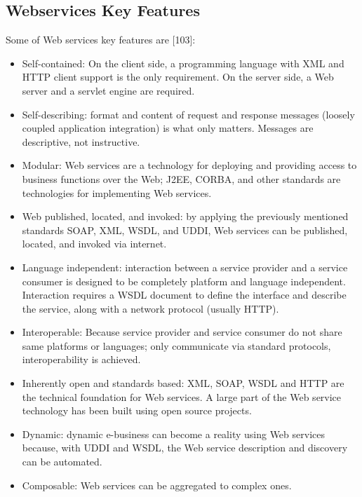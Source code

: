 \documentclass[12pt,a4paper,final,twoside,onecolumn,titlepage]{book}
\begin{document}
\subsection{Webservices Key Features}
Some of Web services key features are [103]:
\begin{itemize}
\item Self-contained: On the client side, a programming language with \gls{XML} and \gls{HTTP} client support is the only requirement. On the server side, a Web server and a servlet engine are required.
\item Self-describing: format and content of request and response messages (loosely coupled application integration) is what only matters. Messages are descriptive, not instructive.
\item Modular: Web services are a technology for deploying and providing access to business functions over the Web; J2EE, \gls{CORBA}, and other standards are technologies for implementing Web services.
\item Web published, located, and invoked: by applying the previously mentioned standards \gls{SOAP}, \gls{XML}, \gls{WSDL}, and \gls{UDDI}, Web services can be published, located, and invoked via internet.
\item Language independent: interaction between a service provider and a service consumer is designed to be completely platform and language independent. Interaction requires a \gls{WSDL} document to define the interface and describe the service, along with a network protocol (usually \gls{HTTP}). 
\item Interoperable: Because service provider and service consumer do not share same platforms or languages; only communicate via standard protocols, interoperability is achieved.
\item Inherently open and standards based: \gls{XML}, \gls{SOAP}, \gls{WSDL} and \gls{HTTP} are the technical foundation for Web services. A large part of the Web service technology has been built using open source projects. 
\item Dynamic: dynamic e-business can become a reality using Web services because, with \gls{UDDI} and \gls{WSDL}, the Web service description and discovery can be automated.
\item Composable: Web services can be aggregated to complex ones.
\end{itemize}
\end{document}
